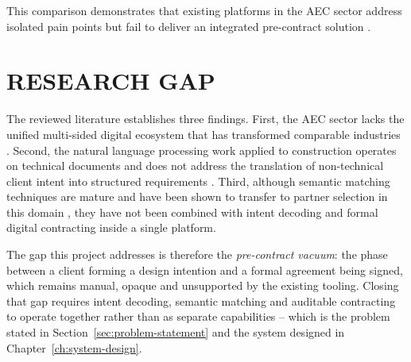 This comparison demonstrates that existing platforms in the AEC sector
address isolated pain points but fail to deliver an integrated
pre-contract solution \cite{hossain2018platform}.

\section{RESEARCH GAP}
\label{sec:lit-gap}

The reviewed literature establishes three findings. First, the AEC
sector lacks the unified multi-sided digital ecosystem that has
transformed comparable industries \cite{hossain2018platform}. Second,
the natural language processing work applied to construction operates
on technical documents and does not address the translation of
non-technical client intent into structured requirements
\cite{lee2017extraction, wu2022nlp}. Third, although semantic matching
techniques are mature and have been shown to transfer to partner
selection in this domain \cite{reimers2019sbert, zhang2021hybrid}, they
have not been combined with intent decoding and formal digital
contracting inside a single platform.

The gap this project addresses is therefore the \emph{pre-contract
vacuum}: the phase between a client forming a design intention and a
formal agreement being signed, which remains manual, opaque and
unsupported by the existing tooling. Closing that gap requires intent
decoding, semantic matching and auditable contracting to operate
together rather than as separate capabilities -- which is the problem
stated in Section~\ref{sec:problem-statement} and the system designed in
Chapter~\ref{ch:system-design}.

